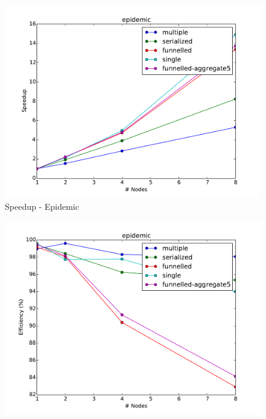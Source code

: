 \documentclass[11pt]{book}
\begin{document}
\pagebreak
\begin{figure}
  \begin{minipage}{.5\textwidth}
    \begin{center}
      \includegraphics[width=\textwidth,keepaspectratio,quiet]{figs/partitioning_communication/communication_epidemic_speedup.pdf} \\
      Speedup - Epidemic \\
    \end{center}
  \end{minipage}%
  \hfill
  \begin{minipage}{.5\textwidth}
    \begin{center}
      \includegraphics[width=\textwidth,keepaspectratio,quiet]{figs/partitioning_communication/communication_epidemic_efficiency.pdf} \\

\end{center}
\end{minipage}
\end{figure}
\end{document}
